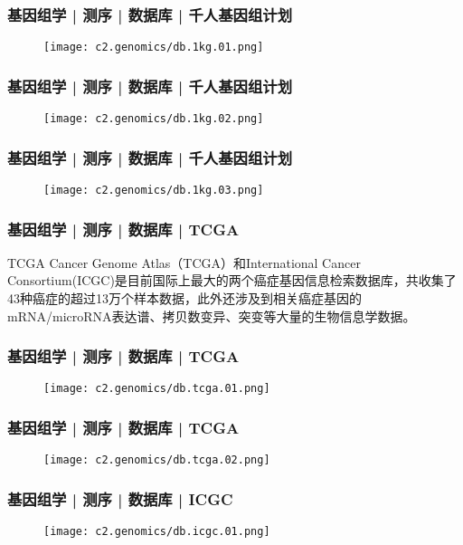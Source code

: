\begin{frame}
  \frametitle{基因组学 | 测序 | 数据库 | 千人基因组计划}
  \begin{figure}
    \centering
    \texttt{[image: c2.genomics/db.1kg.01.png]}
  \end{figure}
\end{frame}
    
\begin{frame}
  \frametitle{基因组学 | 测序 | 数据库 | 千人基因组计划}
  \begin{figure}
    \centering
    \texttt{[image: c2.genomics/db.1kg.02.png]}
  \end{figure}
\end{frame}
    
\begin{frame}
  \frametitle{基因组学 | 测序 | 数据库 | 千人基因组计划}
  \begin{figure}
    \centering
    \texttt{[image: c2.genomics/db.1kg.03.png]}
  \end{figure}
\end{frame}
    
\begin{frame}
  \frametitle{基因组学 | 测序 | 数据库 | TCGA}
  \begin{block}{TCGA}
Cancer Genome Atlas（TCGA）和International Cancer Consortium(ICGC)是目前国际上最大的两个癌症基因信息检索数据库，共收集了43种癌症的超过13万个样本数据，此外还涉及到相关癌症基因的mRNA/microRNA表达谱、拷贝数变异、突变等大量的生物信息学数据。
  \end{block}
\end{frame}

\begin{frame}
  \frametitle{基因组学 | 测序 | 数据库 | TCGA}
  \begin{figure}
    \centering
    \texttt{[image: c2.genomics/db.tcga.01.png]}
  \end{figure}
\end{frame}
    
\begin{frame}
  \frametitle{基因组学 | 测序 | 数据库 | TCGA}
  \begin{figure}
    \centering
    \texttt{[image: c2.genomics/db.tcga.02.png]}
  \end{figure}
\end{frame}

\begin{frame}
  \frametitle{基因组学 | 测序 | 数据库 | ICGC}
  \begin{figure}
    \centering
    \texttt{[image: c2.genomics/db.icgc.01.png]}
  \end{figure}
\end{frame}
    
